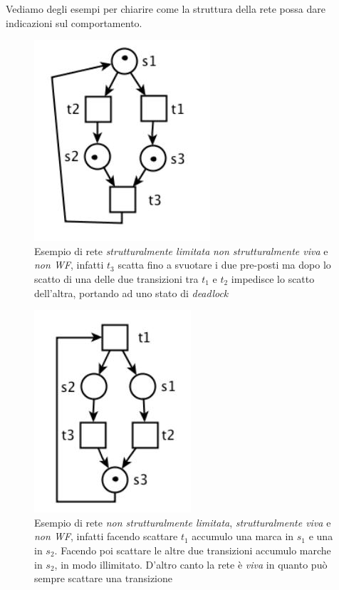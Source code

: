 \documentclass[a4paper,12pt, oneside]{book}
\begin{document}
\begin{esempio}
  Vediamo degli esempi per chiarire come la struttura della rete possa dare
  indicazioni sul comportamento.
  \begin{figure}[H]
    \centering
    \includegraphics[scale = 0.55]{img/as.jpg}
    \caption{Esempio di rete \emph{strutturalmente limitata} \emph{non
        strutturalmente viva} e \emph{non WF}, infatti $t_3$
      scatta fino a svuotare i due pre-posti ma dopo lo scatto di una delle due
      transizioni tra $t_1$ e $t_2$ impedisce lo scatto dell'altra, portando ad
      uno stato di \emph{deadlock}}
  \end{figure}
  \begin{figure}[H]
    \centering
    \includegraphics[scale = 0.55]{img/as2.jpg}
    \caption{Esempio di rete \emph{non strutturalmente limitata},
      \emph{strutturalmente viva} e \emph{non WF}, infatti facendo scattare
      $t_1$ accumulo una marca in $s_1$ e una in $s_2$. Facendo poi scattare le
      altre due transizioni accumulo marche in $s_2$, in modo
      illimitato. D'altro canto la rete è \emph{viva} in quanto può sempre
      scattare una transizione} 

\end{figure}
\end{esempio}
\end{document}
